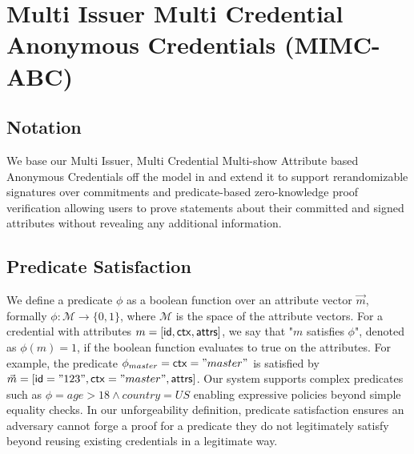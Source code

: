 \section{Multi Issuer Multi Credential Anonymous Credentials (MIMC-ABC)}\label{sec:mimc}


\subsection{Notation}
We base our Multi Issuer, Multi Credential Multi-show Attribute based Anonymous Credentials off the model in \cite{fuchsbauer_structure-preserving_2019} and extend it to support rerandomizable signatures over commitments and predicate-based zero-knowledge proof verification allowing users to prove statements about their committed and signed attributes without revealing any additional information.

\subsection{Predicate Satisfaction}
We define a predicate $\phi$ as a boolean function over an attribute vector $\vec{m}$, formally  $\phi: \mathcal{M} \rightarrow \{0,1\}$, where $\mathcal{M}$ is the space of the attribute vectors. 
For a credential with attributes $m = [\mathsf{id}, \mathsf{ctx}, \mathsf{attrs}]$, we say that "$m$ satisfies $\phi$", denoted as $\phi(m) = 1$, if the boolean function evaluates to true on the attributes.
For example, the predicate $\phi_{master} = \mathsf{ctx} = "master"$ is satisfied by $\vec{m} = [\mathsf{id}="123", \mathsf{ctx}="master", \mathsf{attrs}]$. Our system supports complex predicates such as $\phi = age > 18 \wedge country = US$ enabling expressive policies beyond simple equality checks. In our unforgeability definition, predicate satisfaction ensures an adversary cannot forge a proof for a predicate they do not legitimately satisfy beyond reusing existing credentials in a legitimate way.

